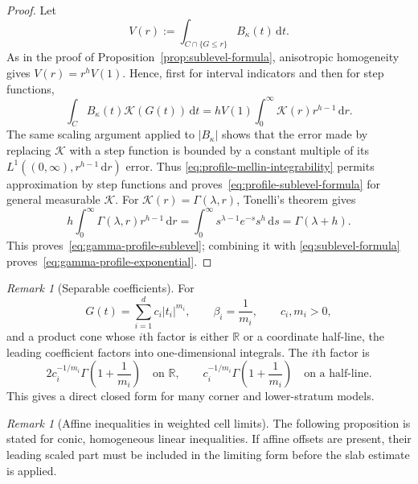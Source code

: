 \documentclass[11pt]{amsart}
\numberwithin{equation}{section}
\theoremstyle{definition}
\theoremstyle{remark}
\newtheorem{remark}[theorem]{Remark}
\newcommand{\R}{\mathbb{R}}
\newcommand{\dd}{\,\mathrm{d}}
\begin{document}
\begin{proof}
Let
\[
 V(r):=\int_{C\cap\{G\le r\}}B_\kappa(t)\dd t.
\]
As in the proof of Proposition~\ref{prop:sublevel-formula}, anisotropic
homogeneity gives $V(r)=r^hV(1)$.  Hence, first for interval indicators and
then for step functions,
\[
 \int_C B_\kappa(t)\mathcal K(G(t))\dd t
 =hV(1)\int_0^\infty \mathcal K(r)r^{h-1}\dd r.
\]
The same scaling argument applied to $|B_\kappa|$ shows that the error made
by replacing $\mathcal K$ with a step function is bounded by a constant multiple of its
$L^1((0,\infty),r^{h-1}\dd r)$ error.  Thus
\eqref{eq:profile-mellin-integrability} permits approximation by step functions
and proves~\eqref{eq:profile-sublevel-formula} for general measurable $\mathcal K$.
For $\mathcal K(r)=\Gamma(\lambda,r)$, Tonelli's theorem gives
\[
 h\int_0^\infty \Gamma(\lambda,r)r^{h-1}\dd r
 =\int_0^\infty s^{\lambda-1}e^{-s}s^h\dd s
 =\Gamma(\lambda+h).
\]
This proves~\eqref{eq:gamma-profile-sublevel}; combining it with
\eqref{eq:sublevel-formula} proves~\eqref{eq:gamma-profile-exponential}.
\end{proof}


\begin{remark}[Separable coefficients]\label{rem:separable-coefficients}
For
\[
 G(t)=\sum_{i=1}^d c_i|t_i|^{m_i},\qquad
 \beta_i=\frac1{m_i},\qquad c_i,m_i>0,
\]
and a product cone whose $i$th factor is either $\R$ or a coordinate
half-line, the leading coefficient factors into one-dimensional integrals.
The $i$th factor is
\[
 2c_i^{-1/m_i}\Gamma\!\left(1+\frac1{m_i}\right)
 \quad\text{on }\R,
 \qquad
 c_i^{-1/m_i}\Gamma\!\left(1+\frac1{m_i}\right)
 \quad\text{on a half-line}.
\]
This gives a direct closed form for many corner and lower-stratum models.
\end{remark}

\begin{remark}[Affine inequalities in weighted cell limits]
The following proposition is stated for conic, homogeneous
linear inequalities.  If affine offsets are present, their leading scaled part
must be included in the limiting form before the slab estimate is applied.
\end{remark}
\end{document}

